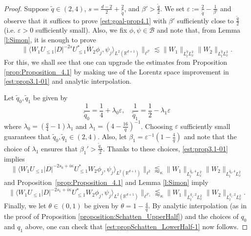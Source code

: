 \documentclass[a4paper]{amsart}
\numberwithin{equation}{section}%
\theoremstyle{plain}%
\theoremstyle{definition}
\theoremstyle{remark}%
\newcommand{\R}{{\mathbb R}}
\begin{document}
\begin{proof}
Suppose $\widetilde{q} \in (2,4)$, $s= \frac{d-2}{2} + \frac{2}{\widetilde{q}}$, and $\beta' > \frac{\widetilde{q}}{2}$. We set $\varepsilon := \frac{2}{\widetilde{q}} - \frac{1}{\beta'}$ and observe that it suffices to prove \eqref{est:goal-prop4.1} with $\beta'$ sufficiently close to $\frac{\widetilde{q}}{2}$ (i.e. $\varepsilon > 0$ sufficiently small). Also, we fix
$\phi, \psi \in \mathcal{B}$ and note that, from Lemma \ref{l:Simon}, it is enough to prove 
\begin{equation}\label{est:propSchatten_LowerHalf-1}
\|\langle W_1 U_{\leq 1} |D|^{- 2s} U_{\leq 1}^* \overline{W}_2 \phi_j,  \psi_j \rangle_{L^2(\R^{d+1})} \|_{\ell^{\beta'}} \lesssim \|W_1 \|_{L_t^{\widetilde{q}} L_x^2} \|W_2 \|_{L_t^{\widetilde{q}} L_x^2}.
\end{equation}
For this, we shall see that one can upgrade the estimates from Proposition \ref{prop:Proposition_4.1} by making use of the Lorentz space improvement in \eqref{est:prop3.1-01} and analytic interpolation.

Let $\widetilde{q}_0, \widetilde{q}_1$ be given by
\[
\frac{1}{\widetilde{q}_0} = \frac{1}{4} + \lambda_0 \varepsilon, \quad \frac{1}{\widetilde{q}_1} = \frac{1}{2} - \lambda_1\varepsilon
\]
where $\lambda_0 = (\frac{q}{4} - 1)\lambda_1$ and $\lambda_1 = (4 - \frac{16}{q})^{-1}$. Choosing $\varepsilon$ sufficiently small guarantees that $\widetilde{q}_0, \widetilde{q}_1 \in (2,4)$. Also, let $\beta_1 = \varepsilon^{-1}(1 - \frac{4}{q})$ and note that the choice of $\lambda_1$ ensures that $\beta_1' > \frac{\widetilde{q}_1}{2}$. Thanks to these choices, \eqref{est:prop3.1-01} implies
\begin{equation*}
\|\langle W_1 U_{\leq 1} |D|^{- 2s_0 + i \kappa}  U_{\leq 1}^* W_2 \phi_j,  \psi_j \rangle_{L^2(\R^{d+1})} \|_{\ell^{2}}
\lessapprox_\kappa \|W_1 \|_{L_t^{\widetilde{q_0}, 4} L_x^2} \|W_2 \|_{L_t^{\widetilde{q_0}, 4} L_x^2}
\end{equation*}
and Proposition~\ref{prop:Proposition_4.1} and Lemma \ref{l:Simon} imply
\begin{equation}\label{est:prop4.6-02}
\|\langle W_1 U_{\leq 1} |D|^{- 2s_1 + i \kappa} U_{\leq 1}^* W_2 \phi_j,  \psi_j \rangle_{L^2(\R^{d+1})} \|_{\ell^{\beta'_1}} \lessapprox_\kappa \|W_1 \|_{L_t^{\widetilde{q_1},2} L_x^2} \|W_2 \|_{L_t^{\widetilde{q_1},2} L_x^2}.
\end{equation}
Finally, we let $\theta \in (0,1)$ be given by $\theta = 1 - \frac{4}{q}$. By analytic interpolation (as in the proof of Proposition \ref{proposition:Schatten_UpperHalf}) and the choices of $q_0$ and $q_1$ above, one can check that \eqref{est:propSchatten_LowerHalf-1} now follows.
\end{proof}
\end{document}
